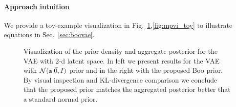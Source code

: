 \paragraph{Approach intuition} We provide a toy-example visualization in Fig.~\ref{fig:2dkek},\ref{fig:mpvi_toy} to illustrate equations in Sec.~\ref{sec:boovae}.
\begin{figure}[t!]
	\centering
	 \hfill
		\caption{Visualization of the prior density and aggregate posterior for the VAE with 2-d latent space. In left we present results for the VAE with $\mathcal{N}({\mathbf{z}}|\vec{0}, I)$ prior and in the right with the proposed Boo prior. By visual inspection and KL-divergence comparison we conclude that the proposed prior matches the aggregated posterior better that a standard normal prior.}\label{fig:2dkek}
	\vspace*{\baselineskip}
\end{figure}


